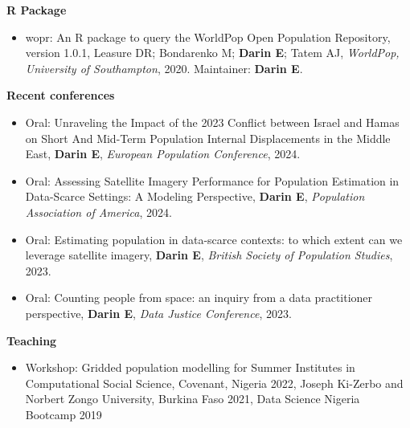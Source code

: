 \documentclass[
]{friggeri-cv}
\begin{document}
\begin{noside}
\begin{itemize}
\end{itemize}

\textbf{R Package}
\begin{itemize}
\item wopr: An R package to query the WorldPop Open Population Repository, version 1.0.1, Leasure DR; Bondarenko M; \textbf{Darin E}; Tatem AJ, \textit{WorldPop, University of Southampton}, 2020. Maintainer: \textbf{Darin E}. \href{https://apps.worldpop.org/woprVision/}{\scriptsize{}}
\end{itemize}

\textbf{Recent conferences}
\begin{itemize}
\item Oral: Unraveling the Impact of the 2023 Conflict between Israel and Hamas on Short And Mid-Term Population Internal Displacements in the Middle East, \textbf{Darin E}, \textit{European Population Conference}, 2024.
\item Oral: Assessing Satellite Imagery Performance for Population Estimation in Data-Scarce Settings: A Modeling Perspective, \textbf{Darin E}, \textit{Population Association of America}, 2024.
\item Oral: Estimating population in data-scarce contexts: to which extent can we leverage satellite imagery, \textbf{Darin E}, \textit{British Society of Population Studies}, 2023.
\item Oral: Counting people from space: an inquiry from a data practitioner perspective, \textbf{Darin E}, \textit{Data Justice Conference}, 2023.
\end{itemize}
\textbf{Teaching}
\begin{itemize}
\item Workshop: Gridded population modelling for Summer Institutes in Computational Social Science, Covenant, Nigeria 2022, Joseph Ki-Zerbo and Norbert Zongo University, Burkina Faso 2021, Data Science Nigeria Bootcamp 2019


\end{itemize}
\end{noside}
\end{document}
